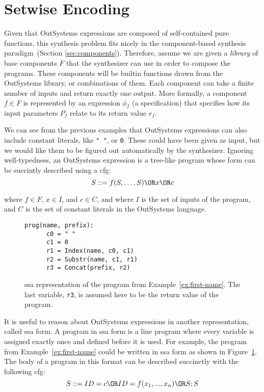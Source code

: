 \section{Setwise Encoding}
\label{sec:setwise-encoding}

Given that OutSystems expressions are composed of self-contained pure functions,
this synthesis problem fits nicely in the component-based synthesis
paradigm~(Section \ref{sec:components}). Therefore, assume we are given a
\textit{library} of base components $F$ that the synthesizer can use in order to
compose the programs. These components will be builtin functions drawn from the
OutSystems library, or combinations of them. Each component can take a finite
number of inputs and return exactly one output. More formally, a component $f
\in F$ is represented by an expression $\phi{}_f$ (a specification) that
specifies how its input parameters $P_f$ relate to its return value $r_f$.

We can see from the previous examples that OutSystems expressions can also
include constant literals, like \lstinline{" "}, or \lstinline{0}. These could
have been given as input, but we would like them to be figured out automatically
by the synthesizer. Ignoring well-typedness, an OutSystems expression is a
tree-like program whose form can be succintly described using a \gls{cfg}:
%
\[S ::= f(S, \ldots, S) \OR x \OR c\]

\noindent
where $f \in F$, $x \in I$, and $c \in C$, and where $I$ is the set of inputs of
the program, and $C$ is the set of constant literals in the OutSystems language.

\begin{figure}
  \begin{lstlisting}[frame=tlrb]
    prog(name, prefix):
      c0 = " "
      c1 = 0
      r1 = Index(name, c0, c1)
      r2 = Substr(name, c1, r1)
      r3 = Concat(prefix, r2)
  \end{lstlisting}
\caption{\gls{ssa} representation of the program from
    Example~\ref{ex:first-name}. The last variable, \lstinline{r3}, is assumed
    here to be the return value of the program.}
\label{fig:first-name-ssa}
\end{figure}

It is useful to reason about OutSystems expressions in another representation,
called \gls{ssa} form. A program in \gls{ssa} form is a line program where every
variable is assigned exactly once and defined before it is used. For example,
the program from Example~\ref{ex:first-name} could be written in \gls{ssa} form
as shown in Figure~\ref{fig:first-name-ssa}. The body of a program in this
format can be described succinctly with the following \gls{cfg}:
%
\[S ::= ID = c \OR ID = f(x_1, ..., x_n) \OR S;S\]

